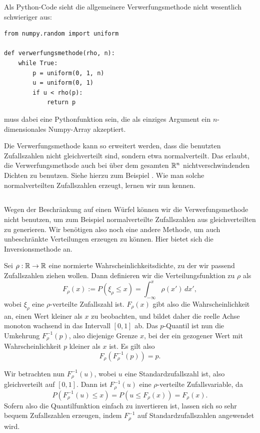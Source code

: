 Als Python-Code sieht die allgemeinere Verwerfungsmethode nicht
wesentlich schwieriger aus:
\begin{lstlisting}
from numpy.random import uniform

def verwerfungsmethode(rho, n):
    while True:
        p = uniform(0, 1, n)
        u = uniform(0, 1)
        if u < rho(p):
            return p
\end{lstlisting}
 muss dabei eine Pythonfunktion sein, die als einziges
Argument ein $n$-dimensionales Numpy-Array akzeptiert.

Die Verwerfungsmethode kann so erweitert werden, dass die benutzten
Zufallszahlen  nicht gleichverteilt sind, sondern etwa
normalverteilt. Das erlaubt, die Verwerfungsmethode auch bei über dem
gesamten $\mathbb{R}^n$ nichtverschwindenden Dichten zu benutzen. Siehe
hierzu zum Beispiel \textcite{knuth81b}. Wie man solche
normalverteilten Zufallszahlen erzeugt, lernen wir nun kennen.

\subsection{}

Wegen der Beschränkung auf einen Würfel können wir die
Verwerfungsmethode nicht benutzen, um zum Beispiel normalverteilte
Zufallszahlen aus gleichverteilten zu generieren. Wir benötigen also
noch eine andere Methode, um auch unbeschränkte Verteilungen erzeugen
zu können. Hier bietet sich die Inversionsmethode an.

Sei $\rho:\mathbb{R}\to \mathbb{R}$ eine normierte Wahrscheinlichkeitsdichte, zu der
wir passend Zufallszahlen ziehen wollen. Dann definieren wir die
Verteilungsfunktion zu $\rho$ als
\begin{equation}
  F_\rho(x) := P(\xi_\rho \le x) = \int_{-\infty}^{x} \rho(x')\, dx',
\end{equation}
wobei $\xi_\rho$ eine $\rho$-verteilte Zufallszahl ist.  $F_\rho(x)$
gibt also die Wahrscheinlichkeit an, einen Wert kleiner als $x$ zu
beobachten, und bildet daher die reelle Achse monoton wachsend in das
Intervall $[0,1]$ ab. Das $p$-Quantil ist nun die Umkehrung
$F_\rho^{-1}(p)$, also diejenige Grenze $x$, bei der ein gezogener
Wert mit Wahrscheinlichkeit $p$ kleiner als $x$ ist. Es gilt also
\begin{equation}
  F_\rho\left(F_\rho^{-1}(p)\right) = p.
\end{equation}

Wir betrachten nun $F_\rho^{-1}(u)$, wobei $u$ eine
Standardzufallszahl ist, also gleichverteilt auf $[0,1]$.  Dann ist
$F_\rho^{-1}(u)$ eine $\rho$-verteilte Zufallsvariable, da
\begin{equation}
  P(F_\rho^{-1}(u) \le x) = P(u \le F_\rho(x)) = F_\rho(x).
\end{equation}
Sofern also die Quantilfunktion einfach zu invertieren ist, lassen
sich so sehr bequem Zufallszahlen erzeugen, indem $F_\rho^{-1}$ auf
Standardzufallszahlen angewendet wird.

